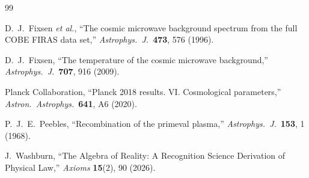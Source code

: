 \documentclass[12pt,a4paper]{article}
\theoremstyle{definition}
\theoremstyle{remark}
\begin{document}
\begin{thebibliography}{99}

D.~J.~Fixsen \textit{et al.}, ``The cosmic microwave background spectrum
from the full COBE FIRAS data set,'' \textit{Astrophys.\ J.}\ \textbf{473},
576 (1996).

D.~J.~Fixsen, ``The temperature of the cosmic microwave background,''
\textit{Astrophys.\ J.}\ \textbf{707}, 916 (2009).

Planck Collaboration, ``Planck 2018 results. VI. Cosmological
parameters,'' \textit{Astron.\ Astrophys.}\ \textbf{641}, A6 (2020).

P.~J.~E.~Peebles, ``Recombination of the primeval plasma,''
\textit{Astrophys.\ J.}\ \textbf{153}, 1 (1968).

J.~Washburn, ``The Algebra of Reality: A Recognition Science Derivation
of Physical Law,'' \textit{Axioms} \textbf{15}(2), 90 (2026).

\end{thebibliography}
\end{document}
